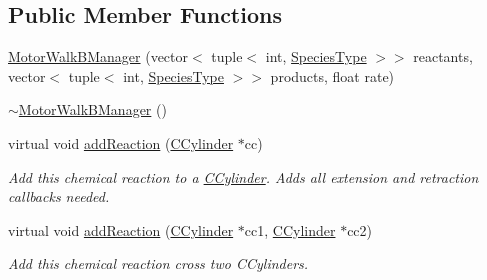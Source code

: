 \subsection*{Public Member Functions}
\begin{DoxyCompactItemize}
\item 
\hyperlink{classMotorWalkBManager_ac056cd351052a263ed589331c96fd5cc}{Motor\+Walk\+B\+Manager} (vector$<$ tuple$<$ int, \hyperlink{Species_8h_a50651af47c56ea0e27235468d23542cf}{Species\+Type} $>$$>$ reactants, vector$<$ tuple$<$ int, \hyperlink{Species_8h_a50651af47c56ea0e27235468d23542cf}{Species\+Type} $>$$>$ products, float rate)
\item 
\hyperlink{classMotorWalkBManager_a621f7f8abf76ba55f465811067424039}{$\sim$\+Motor\+Walk\+B\+Manager} ()
\item 
virtual void \hyperlink{classMotorWalkBManager_a51f22756649c1d14a1d516ee8501024a}{add\+Reaction} (\hyperlink{classCCylinder}{C\+Cylinder} $\ast$cc)
\begin{DoxyCompactList}\small\item\em Add this chemical reaction to a \hyperlink{classCCylinder}{C\+Cylinder}. Adds all extension and retraction callbacks needed. \end{DoxyCompactList}\item 
virtual void \hyperlink{classMotorWalkBManager_aeab62b307495c7791c14b213aa93073e}{add\+Reaction} (\hyperlink{classCCylinder}{C\+Cylinder} $\ast$cc1, \hyperlink{classCCylinder}{C\+Cylinder} $\ast$cc2)
\begin{DoxyCompactList}\small\item\em Add this chemical reaction cross two C\+Cylinders. \end{DoxyCompactList}\end{DoxyCompactItemize}
